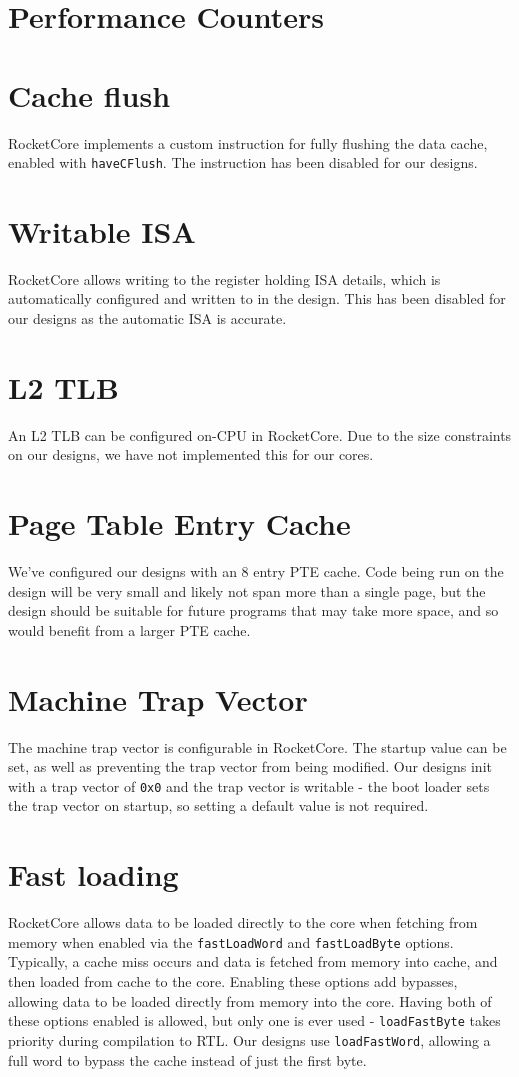 \section{Performance Counters} %

\section{Cache flush}
RocketCore implements a custom instruction for fully flushing the data cache, enabled with \texttt{haveCFlush}. The instruction has been disabled for our designs.

\section{Writable ISA}
RocketCore allows writing to the register holding ISA details, which is automatically configured and written to in the design. This has been disabled for our designs as the automatic ISA is accurate.

\section{L2 TLB}
An L2 TLB can be configured on-CPU in RocketCore. Due to the size constraints on our designs, we have not implemented this for our cores.

\section{Page Table Entry Cache}
We've configured our designs with an 8 entry PTE cache. Code being run on the design will be very small and likely not span more than a single page, but the design should be suitable for future programs that may take more space, and so would benefit from a larger PTE cache.

\section{Machine Trap Vector}
The machine trap vector is configurable in RocketCore. The startup value can be set, as well as preventing the trap vector from being modified. Our designs init with a trap vector of \texttt{0x0} and the trap vector is writable - the boot loader sets the trap vector on startup, so setting a default value is not required.

\section{Fast loading}
RocketCore allows data to be loaded directly to the core when fetching from memory when enabled via the \texttt{fastLoadWord} and \texttt{fastLoadByte} options. Typically, a cache miss occurs and data is fetched from memory into cache, and then loaded from cache to the core. Enabling these options add bypasses, allowing data to be loaded directly from memory into the core. Having both of these options enabled is allowed, but only one is ever used - \texttt{loadFastByte} takes priority during compilation to RTL. Our designs use \texttt{loadFastWord}, allowing a full word to bypass the cache instead of just the first byte.

